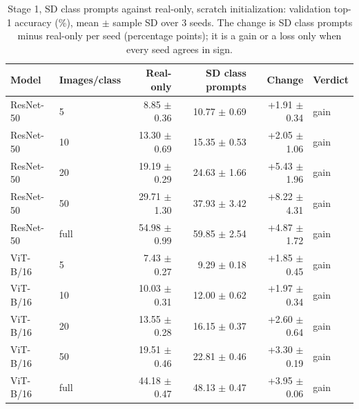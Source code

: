 \begin{table}[H]
\centering
\caption{Stage 1, SD class prompts against real-only, scratch initialization: validation top-1 accuracy (\%), mean $\pm$ sample SD over 3 seeds. The change is SD class prompts minus real-only per seed (percentage points); it is a gain or a loss only when every seed agrees in sign.}
\label{tab:stage1-scratch-accuracy-sd_prompt}
\begin{tabular}{llrrrl}
\toprule
Model & Images/class & Real-only & SD class prompts & Change & Verdict \\
\midrule
ResNet-50 & 5 & 8.85 $\pm$ 0.36 & 10.77 $\pm$ 0.69 & +1.91 $\pm$ 0.34 & gain \\
ResNet-50 & 10 & 13.30 $\pm$ 0.69 & 15.35 $\pm$ 0.53 & +2.05 $\pm$ 1.06 & gain \\
ResNet-50 & 20 & 19.19 $\pm$ 0.29 & 24.63 $\pm$ 1.66 & +5.43 $\pm$ 1.96 & gain \\
ResNet-50 & 50 & 29.71 $\pm$ 1.30 & 37.93 $\pm$ 3.42 & +8.22 $\pm$ 4.31 & gain \\
ResNet-50 & full & 54.98 $\pm$ 0.99 & 59.85 $\pm$ 2.54 & +4.87 $\pm$ 1.72 & gain \\
\midrule
ViT-B/16 & 5 & 7.43 $\pm$ 0.27 & 9.29 $\pm$ 0.18 & +1.85 $\pm$ 0.45 & gain \\
ViT-B/16 & 10 & 10.03 $\pm$ 0.31 & 12.00 $\pm$ 0.62 & +1.97 $\pm$ 0.34 & gain \\
ViT-B/16 & 20 & 13.55 $\pm$ 0.28 & 16.15 $\pm$ 0.37 & +2.60 $\pm$ 0.64 & gain \\
ViT-B/16 & 50 & 19.51 $\pm$ 0.46 & 22.81 $\pm$ 0.46 & +3.30 $\pm$ 0.19 & gain \\
ViT-B/16 & full & 44.18 $\pm$ 0.47 & 48.13 $\pm$ 0.47 & +3.95 $\pm$ 0.06 & gain \\
\bottomrule
\end{tabular}
\end{table}
